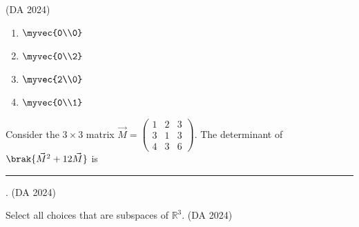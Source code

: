 	\hfill (DA 2024)
\begin{multicols}{4}
\begin{enumerate}
\item $\myvec{0\\0}$
\item $\myvec{0\\2}$
\item $\myvec{2\\0}$
\item $\myvec{0\\1}$
\end{enumerate} 
\end{multicols}
\item Consider the $3\times 3$ matrix
	$
\vec{M}=
\begin{pmatrix}
1 & 2 & 3\\
3 & 1 & 3\\
4 & 3 & 6
\end{pmatrix}
$.
The determinant of $\brak{\vec{M}^2 + 12\vec{M}}$ is \rule{8em}{0.07em}.
	\hfill (DA 2024)
\item Select all choices that are subspaces of $\mathbb{R}^3$.
	\hfill (DA 2024)
